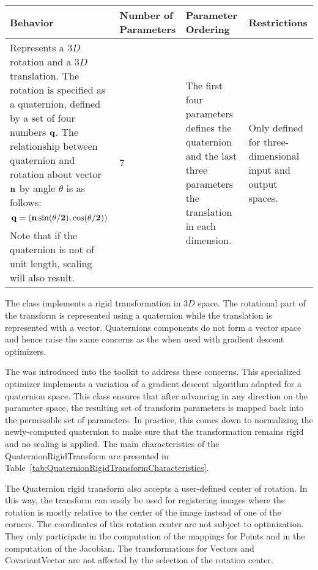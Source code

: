 \begin{table}
\begin{center}
\begin{tabular}{| p{4cm} | p{1.8cm} | p{2.5cm} | p{3cm} |}
\hline
\textbf{Behavior} &
\textbf{Number of Parameters} &
\textbf{Parameter Ordering} &
\textbf{Restrictions} \\
\hline\hline
Represents a $3D$ rotation and a $3D$ translation. The rotation is specified as a
quaternion, defined by a set of four numbers $\bf{q}$.  The relationship
between quaternion and rotation about vector $\bf{n}$ by angle $\theta$ is as
follows: \[ \bf{q} = (\bf{n}\sin(\theta/2), \cos(\theta/2))\] Note that if the
quaternion is not of unit length, scaling will also result. &
7 &
The first four parameters defines the quaternion and the last three parameters
the translation in each dimension. &
Only defined for three-dimensional input and output spaces. \\
\hline
\end{tabular}
\end{center}
\end{table}

The  class implements a rigid
transformation in $3D$ space. The rotational part of the transform is
represented using a quaternion while the translation is represented with a
vector. Quaternions components do not form a vector space and hence raise the
same concerns as the  when used with gradient
descent optimizers.

The  was introduced into the toolkit to address these concerns.  This specialized optimizer implements a variation of a
gradient descent algorithm adapted for a quaternion space.  This class
ensures that after advancing in any direction on the parameter space, the
resulting set of transform parameters is mapped back into the permissible
set of parameters. In practice, this comes down to normalizing the newly-computed quaternion to make sure that the transformation remains rigid and no
scaling is applied.  The main characteristics of the
QuaternionRigidTransform are presented in
Table~\ref{tab:QuaternionRigidTransformCharacteristics}.

The Quaternion rigid transform also accepts a user-defined center of rotation.
In this way, the transform can easily be used for registering images where the
rotation is mostly relative to the center of the image instead of one of the
corners. The coordinates of this rotation center are not subject to
optimization. They only participate in the computation of the mappings for
Points and in the computation of the Jacobian. The transformations for Vectors
and CovariantVector are not affected by the selection of the rotation center.



